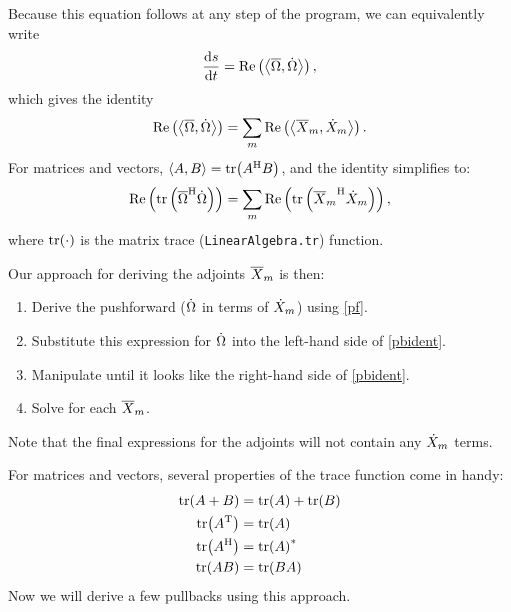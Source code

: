 \documentclass[../../main.tex]{subfiles}
\begin{document}
\begin{refsection}
Because this equation follows at any step of the program, we can equivalently write
\[\dv{s}{t} = \Re\left( \left\langle  \overline{\Omega} ,  \dot{\Omega}  \right\rangle \right),\]
which gives the identity
\begin{equation} \label{pbident}
	\Re\left( \left\langle  \overline{\Omega} ,  \dot{\Omega}  \right\rangle \right) =
	\sum_m \Re\left( \left\langle  \overline{X}_m,  \dot{X}_m  \right\rangle \right).
\end{equation}
For matrices and vectors, $\left\langle A, B \right\rangle = \tr({A}^\mathrm{H} B)$, and the identity simplifies to:
\begin{equation} \label{pbidentmat}
	\Re\left( \tr\left(
		{\overline{\Omega}}^\mathrm{H} \dot{\Omega}
		\right) \right) =
	\sum_m \Re \left( \tr \left(
		{\overline{X}_m}^\mathrm{H} \dot{X}_m
		\right) \right),
\end{equation}
where $\tr(\cdot)$ is the matrix trace (\texttt{LinearAlgebra.tr}) function.

Our approach for deriving the adjoints $\overline{X}_m$ is then:
\begin{enumerate}
	\def\labelenumi{\arabic{enumi}.}
	\item
	      Derive the pushforward ($\dot{\Omega}$ in terms of $\dot{X}_m$) using \eqref{pf}.
	\item
	      Substitute this expression for $\dot{\Omega}$ into the left-hand side of \eqref{pbident}.
	\item
	      Manipulate until it looks like the right-hand side of \eqref{pbident}.
	\item
	      Solve for each $\overline{X}_m$.
\end{enumerate}
Note that the final expressions for the adjoints will not contain any $\dot{X}_m$ terms.

For matrices and vectors, several properties of the trace function come in handy:
\begin{align}
	\tr(A+B)       & = \tr(A) + \tr(B) \label{trexpand} \\
	\tr({A}^\mathrm{T}) & = \tr(A) \nonumber                 \\
	\tr({A}^\mathrm{H}) & = {\tr(A)}^* \nonumber          \\
	\tr(AB)        & = \tr(BA) \label{trperm}
\end{align}
Now we will derive a few pullbacks using this approach.


\end{refsection}
\end{document}
